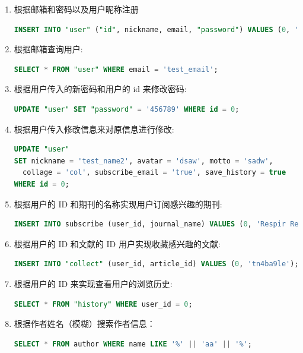 \documentclass[UTF8,openany]{ctexbook}
\begin{document}
\begin{enumerate}[label=\textbf{\arabic*}]
  \item 根据邮箱和密码以及用户昵称注册
  \begin{lstlisting}[language=sql]
INSERT INTO "user" ("id", nickname, email, "password") VALUES (0, 'test_name', 'test_email', '13456');
  \end{lstlisting}

  \item 根据邮箱查询用户:
  \begin{lstlisting}[language=sql]
SELECT * FROM "user" WHERE email = 'test_email';
  \end{lstlisting}

  \item 根据用户传入的新密码和用户的 id 来修改密码:
  \begin{lstlisting}[language=sql]
UPDATE "user" SET "password" = '456789' WHERE id = 0;
  \end{lstlisting}

  \item 根据用户传入修改信息来对原信息进行修改:
  \begin{lstlisting}[language=sql]
UPDATE "user"
SET nickname = 'test_name2', avatar = 'dsaw', motto = 'sadw',
  collage = 'col', subscribe_email = 'true', save_history = true
WHERE id = 0;
  \end{lstlisting}

  \item 根据用户的 ID 和期刊的名称实现用户订阅感兴趣的期刊:
  \begin{lstlisting}[language=sql]
INSERT INTO subscribe (user_id, journal_name) VALUES (0, 'Respir Res');
  \end{lstlisting}

  \item 根据用户的 ID 和文献的 ID 用户实现收藏感兴趣的文献:
  \begin{lstlisting}[language=sql]
INSERT INTO "collect" (user_id, article_id) VALUES (0, 'tn4ba9le');
  \end{lstlisting}

  \item 根据用户的 ID 来实现查看用户的浏览历史:
  \begin{lstlisting}[language=sql]
SELECT * FROM "history" WHERE user_id = 0;
  \end{lstlisting}

  \item 根据作者姓名（模糊）搜索作者信息：
  \begin{lstlisting}[language=sql]
SELECT * FROM author WHERE name LIKE '%' || 'aa' || '%';
  \end{lstlisting}


\end{enumerate}
\end{document}

